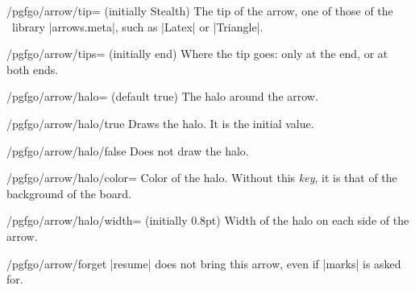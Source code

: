 \begin{key}{/pgfgo/arrow/tip= (initially Stealth)}
	The tip of the arrow, one of those of the \tikzname\ library |arrows.meta|, such as |Latex| or |Triangle|.
\end{key}

\begin{key}{/pgfgo/arrow/tips= (initially end)}
	Where the tip goes: only at the end, or at both ends.

	\begin{codeexample}[]
		\begin{goban}[5]
		\end{goban}
	\end{codeexample}
\end{key}

\begin{key}{/pgfgo/arrow/halo= (default true)}
	The halo around the arrow.
\end{key}

\begin{stylekey}{/pgfgo/arrow/halo/true}
	Draws the halo. It is the initial value.
\end{stylekey}

\begin{stylekey}{/pgfgo/arrow/halo/false}
	Does not draw the halo.
\end{stylekey}

\begin{key}{/pgfgo/arrow/halo/color=}
	Color of the halo. Without this \emph{key}, it is that of the background of the board.
\end{key}

\begin{key}{/pgfgo/arrow/halo/width= (initially 0.8pt)}
	Width of the halo on each side of the arrow.

	\begin{codeexample}[]
		\begin{goban}[5]
		\end{goban}
	\end{codeexample}
\end{key}

\begin{key}{/pgfgo/arrow/forget}
	|resume| does not bring this arrow, even if |marks| is asked for.
\end{key}

